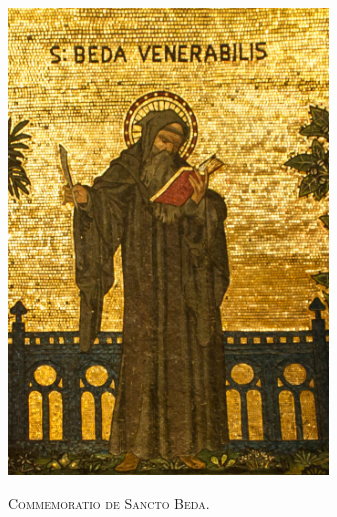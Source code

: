 \documentclass[12pt]{article} %
\begin{document}
\pagestyle{empty}

\begin{center}

\includegraphics[width=8.5cm]{Saint-Bede-the-Venerable.jpg}

\vspace{0.5cm}

\begin{Large}\textsc{\textcolor{benred8}{Commemoratio de Sancto Beda.}}\end{Large}

\end{center}



\def\greinitialformat#1{%
{\fontsize{43}{43}\selectfont #1}%
}

\def\grebiginitialformat#1{%
{\fontsize{120}{120}\selectfont #1}%
}

\end{document}
